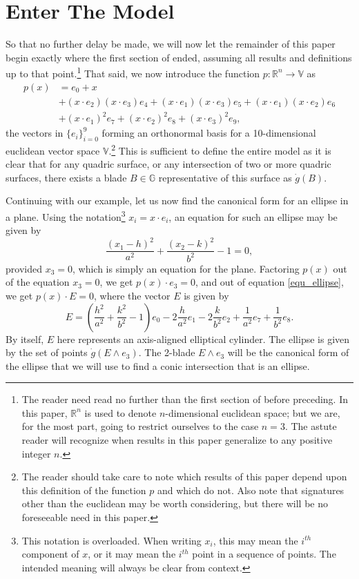 \documentclass{birkjour}
\theoremstyle{definition}
\theoremstyle{remark}
\numberwithin{equation}{section}
\newcommand{\R}{\mathbb{R}}
\newcommand{\G}{\mathbb{G}}
\newcommand{\V}{\mathbb{V}}
\newcommand{\gd}{\dot{g}}
\begin{document}
\section{Enter The Model}

So that no further delay be made, we will now let the remainder of this paper begin
exactly where the first section of \cite{Parkin13} ended, assuming all results and definitions up to that point.\footnote{The
reader need read no further than the first section of \cite{Parkin13} before preceding.  In this paper, $\R^n$ is used to
denote $n$-dimensional euclidean space; but we are, for the most part, going to restrict ourselves to the case $n=3$.
The astute reader will recognize when results in this paper generalize to any positive integer $n$.}
That said, we now introduce the function $p:\R^n\to\V$ as
\begin{align*}
p(x) &= e_0 + x \\
 &+ (x\cdot e_2)(x\cdot e_3)e_4 + (x\cdot e_1)(x\cdot e_3)e_5 + (x\cdot e_1)(x\cdot e_2)e_6 \\
 &+ (x\cdot e_1)^2e_7 + (x\cdot e_2)^2e_8 + (x\cdot e_3)^2 e_9,
\end{align*}
the vectors in $\{e_i\}_{i=0}^9$ forming an orthonormal basis for a 10-dimensional
euclidean vector space $\V$.\footnote{The reader should take care to note which results of this paper
depend upon this definition of the function $p$ and which do not.  Also note that signatures
other than the euclidean may be worth considering, but there will be no foreseeable need in this paper.}
This is sufficient to define the entire model as it is clear that for any quadric
surface, or any intersection of two or more quadric surfaces, there exists a blade
$B\in\G$ representative of this surface as $\gd(B)$.

Continuing with our example, let us now find the canonical form for an ellipse
in a plane.  Using the notation\footnote{This notation is overloaded.  When writing $x_i$, this may mean
the $i^{th}$ component of $x$, or it may mean the $i^{th}$ point in a sequence of points.  The intended
meaning will always be clear from context.} $x_i = x\cdot e_i$, an equation for such an ellipse
may be given by
\begin{equation}\label{equ_ellipse}
\frac{(x_1-h)^2}{a^2} + \frac{(x_2-k)^2}{b^2} - 1 = 0,
\end{equation}
provided $x_3=0$, which is simply an equation for the plane.
Factoring $p(x)$ out of the equation $x_3=0$, we get $p(x)\cdot e_3=0$,
and out of equation \eqref{equ_ellipse}, we get $p(x)\cdot E=0$, where the
vector $E$ is given by
\begin{equation*}
E = \left(\frac{h^2}{a^2}+\frac{k^2}{b^2} - 1\right)e_0 -
  2\frac{h}{a^2}e_1 - 2\frac{k}{b^2}e_2 + \frac{1}{a^2}e_7 + \frac{1}{b^2}e_8.
\end{equation*}
By itself, $E$ here represents an axis-aligned elliptical cylinder.  The ellipse is given by
the set of points $\gd(E\wedge e_3)$.  The 2-blade $E\wedge e_3$ will be the
canonical form of the ellipse that we will use to find a conic intersection that
is an ellipse.
\end{document}
